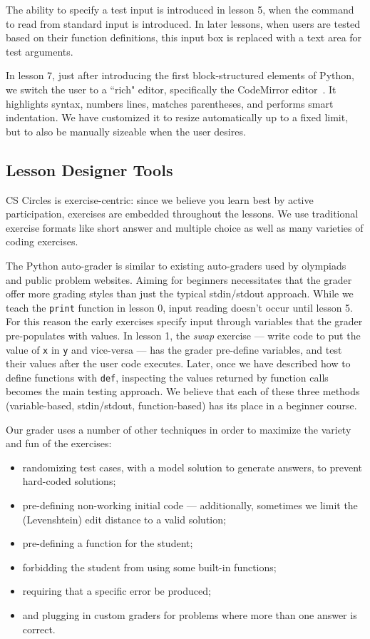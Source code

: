 \documentclass{article}
\begin{document}
{The ability to specify a test input is introduced in lesson 5, when the command to read from standard input is introduced. In later lessons, when users are tested based on their function definitions, this input box is replaced with a text area for test arguments.

In lesson 7, just after introducing the first block-structured elements of Python, we switch the user to a ``rich" editor, specifically the CodeMirror editor~\cite{Haverbeke1x}. It highlights syntax, numbers lines, matches parentheses, and performs smart indentation. We have customized it to resize automatically up to a fixed limit, but to also be manually sizeable when the user desires.

\subsection{Lesson Designer Tools}
CS Circles is exercise-centric: since we believe you learn best by active participation, exercises are embedded throughout the lessons. We use traditional exercise formats like short answer and multiple choice as well as many varieties of coding exercises.

The Python auto-grader is similar to existing auto-graders used by olympiads and public problem websites. Aiming for beginners necessitates that the grader offer more grading styles than just the typical stdin/stdout approach. While we teach the {\tt print} function in lesson 0, input reading doesn't occur until lesson 5. For this reason the early exercises specify input through variables that the grader pre-populates with values. In lesson 1, the \emph{swap} exercise --- write code to put the value of {\tt x} in {\tt y} and vice-versa --- has the grader pre-define variables, and test their values after the user code executes. Later, once we have described how to define functions with {\tt def}, inspecting the values returned by function calls becomes the main testing approach. We believe that each of these three methods (variable-based, stdin/stdout, function-based) has its place in a beginner course.

Our grader uses a number of other techniques in order to maximize the variety and fun of the exercises:
\begin{itemize}
\item randomizing test cases, with a model solution to generate answers, to prevent hard-coded solutions;
\item pre-defining non-working initial code --- additionally, sometimes we limit the (Levenshtein) edit distance to a valid solution;
\item pre-defining a function for the student;
\item forbidding the student from using some built-in functions;
\item requiring that a specific error be produced;
\item and plugging in custom graders for problems where more than one answer is correct.
\end{itemize}

}
\end{document}
